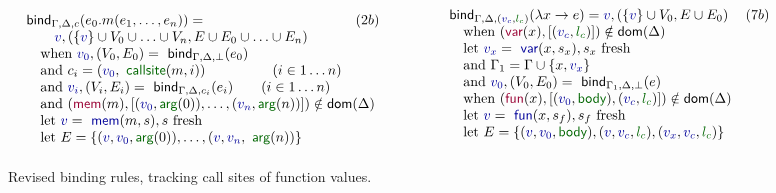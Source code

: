 \documentclass[sigplan,10pt]{acmart}\settopmatter{printfolios=true,printccs=false,printacmref=false}
\theoremstyle{plain}
\theoremstyle{definition}
\newcommand{\ident}[1]{\textnormal{\sffamily #1}}
\newcommand{\bndclr}[1]{\textcolor{kvdclr}{#1}}
\newcommand{\blblclr}[1]{\textcolor{numclr}{#1}}
\newcommand{\bnd}[1]{\textnormal{\textcolor{kvdclr}{\sffamily #1}}}
\newcommand{\bknd}[1]{\textnormal{\textcolor{prepclr}{\sffamily #1}}}
\newcommand{\blbl}[1]{\textnormal{\textcolor{numclr}{\sffamily #1}}}
\begin{document}
\begin{figure}[t]
\vspace{-0.5em}
\begin{equation*}
\begin{array}{ll}
\ident{bind}_{\Gamma, \Delta, c}(e_0.m(e_1, \ldots, e_n)) = &(2b)\\ 
\qquad \bndclr{v}, (\{\bndclr{v}\} \cup V_0 \cup \ldots \cup V_n, E \cup E_0 \cup \ldots \cup E_n)\\
\quad \textnormal{when}~\bndclr{v_0}, (V_0, E_0) = \ident{bind}_{\Gamma, \Delta, \bot}(e_0)\\
\quad \textnormal{and}~c_i = (\bndclr{v_0}, \blbl{callsite}(m,i))\hspace{4.8em} (i \in 1\ldots n)\\
\quad \textnormal{and}~\bndclr{v_i}, (V_i, E_i) = \ident{bind}_{\Gamma, \Delta, c_i}(e_i)\qquad (i\in 1\ldots n)\\
\quad \textnormal{and}~(\bknd{mem}(m),[(\bndclr{v_0}, \blbl{arg}(0)), \ldots, (\bndclr{v_n}, \blbl{arg}(n))]) \notin \ident{dom}(\Delta)\hspace{-200em}.\\
\quad \textnormal{let}~\bndclr{v} = \bnd{mem}(m, s), s~\textnormal{fresh}\\
\quad \textnormal{let}~E = \{ (\bndclr{v}, \bndclr{v_0}, \blbl{arg}(0)), \ldots, (\bndclr{v},\bndclr{v_n}, \blbl{arg}(n)) \}
\end{array}
\qquad\qquad
\begin{array}{ll}
\ident{bind}_{\Gamma, \Delta, (\bndclr{v_c}, \blblclr{l_c} )}(\lambda x \rightarrow e) = \bndclr{v}, (\{\bndclr{v}\} \cup V_0, E \cup E_0)&(7b)\\
\quad \textnormal{when}~(\bknd{var}(x),[(\bndclr{v_c}, \blblclr{l_c} )])\notin \ident{dom}(\Delta)\\
\quad \textnormal{let}~\bndclr{v_x} = \bnd{var}(x, s_x), s_x~\textnormal{fresh}\\
\quad \textnormal{and}~\Gamma_1 = \Gamma \cup \{ x, \bndclr{v_x} \}\\
\quad \textnormal{and}~\bndclr{v_0}, (V_0, E_0) = \ident{bind}_{\Gamma_1, \Delta, \bot}(e)\\
\quad \textnormal{when}~(\bknd{fun}(x),[(\bndclr{v_0}, \blbl{body}), (\bndclr{v_c}, \blblclr{l_c} )])\notin \ident{dom}(\Delta)\\
\quad \textnormal{let}~\bndclr{v} = \bnd{fun}(x, s_f), s_f~\textnormal{fresh}\\
\quad \textnormal{let}~E = \{ (\bndclr{v},\bndclr{v_0},\blbl{body}), (\bndclr{v},\bndclr{v_c},\blblclr{l_c}), (\bndclr{v_x},\bndclr{v_c},\blblclr{l_c}) \}
\\[0.75em]
\end{array}
\end{equation*}
\vspace{-0.5em}
\caption{Revised binding rules, tracking call sites of function values.} 
\label{fig:binding-rules-callsite}
\vspace{-0.5em}
\end{figure}
\end{document}
